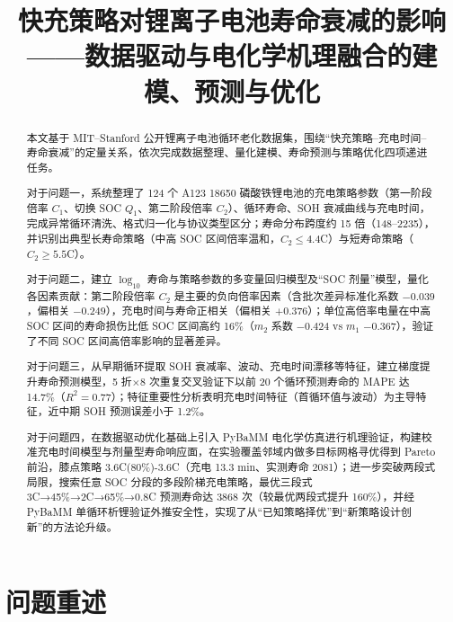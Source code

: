 \documentclass[withoutpreface]{cumcmthesis}
\title{快充策略对锂离子电池寿命衰减的影响\\——数据驱动与电化学机理融合的建模、预测与优化}
\begin{document}
\maketitle

\begin{abstract}
本文基于 MIT--Stanford 公开锂离子电池循环老化数据集，围绕“快充策略--充电时间--寿命衰减”的定量关系，依次完成数据整理、量化建模、寿命预测与策略优化四项递进任务。

对于问题一，系统整理了 124 个 A123 18650 磷酸铁锂电池的充电策略参数（第一阶段倍率 $C_1$、切换 SOC $Q_1$、第二阶段倍率 $C_2$）、循环寿命、SOH 衰减曲线与充电时间，完成异常循环清洗、格式归一化与协议类型区分；寿命分布跨度约 15 倍（148--2235），并识别出典型长寿命策略（中高 SOC 区间倍率温和，$C_2\le 4.4$C）与短寿命策略（$C_2\ge 5.5$C）。

对于问题二，建立 $\log_{10}$ 寿命与策略参数的多变量回归模型及“SOC 剂量”模型，量化各因素贡献：第二阶段倍率 $C_2$ 是主要的负向倍率因素（含批次差异标准化系数 $-0.039$，偏相关 $-0.249$），充电时间与寿命正相关（偏相关 $+0.376$）；单位高倍率电量在中高 SOC 区间的寿命损伤比低 SOC 区间高约 16\%（$m_2$ 系数 $-0.424$ vs $m_1$ $-0.367$），验证了不同 SOC 区间高倍率影响的显著差异。

对于问题三，从早期循环提取 SOH 衰减率、波动、充电时间漂移等特征，建立梯度提升寿命预测模型，5 折$\times$8 次重复交叉验证下以前 20 个循环预测寿命的 MAPE 达 14.7\%（$R^2=0.77$）；特征重要性分析表明充电时间特征（首循环值与波动）为主导特征，近中期 SOH 预测误差小于 1.2\%。

对于问题四，在数据驱动优化基础上引入 PyBaMM 电化学仿真进行机理验证，构建校准充电时间模型与剂量型寿命响应面，在实验覆盖邻域内做多目标网格寻优得到 Pareto 前沿，膝点策略 3.6C(80\%)-3.6C（充电 13.3 min、实测寿命 2081）；进一步突破两段式局限，搜索任意 SOC 分段的多段阶梯充电策略，最优三段式 3C→45\%→2C→65\%→0.8C 预测寿命达 3868 次（较最优两段式提升 160\%），并经 PyBaMM 单循环析锂验证外推安全性，实现了从“已知策略择优”到“新策略设计创新”的方法论升级。

\end{abstract}

\section{问题重述}
\end{document}

